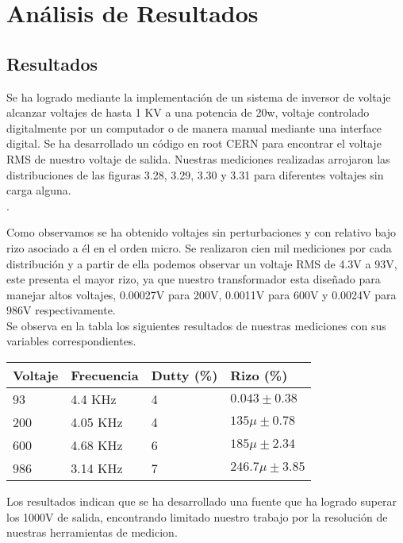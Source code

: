 \chapter{Análisis de Resultados}
\section{Resultados}

Se ha logrado mediante la implementación de un sistema de inversor de voltaje alcanzar voltajes de hasta 1 KV a una potencia de 20w, voltaje controlado digitalmente por un computador o de manera manual mediante una interface digital. Se ha desarrollado un código en root CERN para encontrar el voltaje RMS de nuestro voltaje de salida. Nuestras mediciones realizadas arrojaron las  distribuciones de las figuras 3.28, 3.29, 3.30 y 3.31 para diferentes voltajes sin carga alguna. \\.


Como observamos se ha obtenido voltajes sin perturbaciones y con relativo bajo rizo asociado a él en el orden micro. Se realizaron cien mil mediciones por cada distribución y a partir de ella podemos observar un voltaje RMS de 4.3V a 93V, este presenta el mayor rizo, ya que nuestro transformador esta diseñado para manejar altos voltajes, 0.00027V para 200V, 0.0011V para 600V y 0.0024V para 986V respectivamente. \\

Se observa en la tabla los siguientes resultados de nuestras mediciones con sus variables correspondientes. 

\begin{table}[H]
\begin{tabular}{@{}llll@{}}
\toprule
Voltaje   & Frecuencia & Dutty (\%) & Rizo (\%)\\ \midrule
93  & 4.4 KHz        & 4   & $0.043\pm 0.38$\\
200 & 4.05 KHz        & 4   &   $135\mu\pm 0.78$ \\
600 & 4.68 KHz        & 6   &   $185\mu\pm 2.34$ \\
986 & 3.14 KHz       & 7   &   $246.7 \mu \pm 3.85$ \\ \bottomrule
\end{tabular}
\end{table}


Los resultados indican que se ha desarrollado una fuente que ha logrado superar los 1000V de salida, encontrando limitado nuestro trabajo por la resolución de nuestras herramientas de medicion.  
